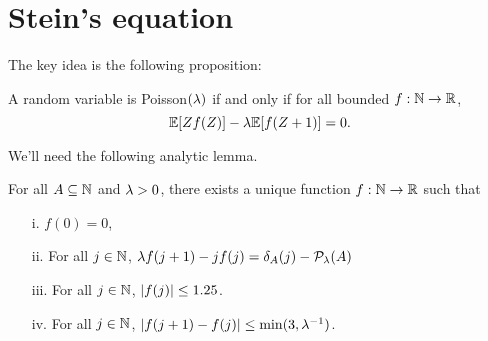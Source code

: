 \section{Stein's equation}
The key idea is the following proposition:
\begin{prop}\label{stien}
    A random variable is Poisson$(\lambda)$ if and only if for all bounded $f : {{\mathbb N}} \to {\mathbb R}$,
    \[{\mathbb{E}}[Zf(Z)]-\lambda {\mathbb{E}}[f(Z+1)]=0. \]
\end{prop}
We'll need the following analytic lemma.
\begin{lemma}[$**$]\label{**}
    For all $A \subseteq {{\mathbb N}}$ and $\lambda > 0$, there exists a unique function $f : {{\mathbb N}} \to {\mathbb R}$ such that 
    \begin{enumerate}
        \item[i.] $f(0)=0$,
        \item[ii.] For all $j \in {{\mathbb N}}$, $\lambda f(j+1)-jf(j) = \delta_A(j)-{\mathcal{P}}_\lambda(A)$
        \item[iii.] For all $j \in {{\mathbb N}}$, ${\left\lvert f(j)\right\rvert} \le 1.25$.
        \item[iv.] For all $j \in {{\mathbb N}}$, ${\left\lvert f(j+1)-f(j)\right\rvert} \le \min(3,\lambda^{-1})$. 
    \end{enumerate} 
\end{lemma}
